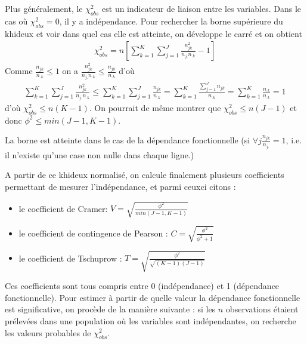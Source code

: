 \documentclass[letterpaper,10pt,english]{jupyterBook}
\begin{document}
\sphinxAtStartPar
Plus généralement, le \(\chi^2_{obs}\) est un indicateur de liaison entre les variables.  Dans le cas où \(\chi^2_{obs}=0\), il y a indépendance. Pour rechercher la borne supérieure du khi\sphinxhyphen{}deux et voir dans quel cas elle est atteinte, on développe le carré et on obtient
\begin{equation*}
\begin{split}\chi^2_{obs} = n\left [\displaystyle\sum_{k=1}^K\displaystyle\sum_{j=1}^J \frac{n_{jk}^2}{n_{j.}n_{.k}} -1\right ]\end{split}
\end{equation*}
\sphinxAtStartPar
Comme \(\frac{n_{jk}}{n_{.k}}\leq 1\) on a \( \frac{n_{jk}^2}{n_{j.}n_{.k}} \leq \frac{n_{jk}}{n_{.k}}\) d’où
\begin{equation*}
\begin{split}\displaystyle\sum_{k=1}^K\displaystyle\sum_{j=1}^J\frac{n_{jk}^2}{n_{j.}n_{.k}}\leq \displaystyle\sum_{k=1}^K\displaystyle\sum_{j=1}^J \frac{n_{jk}}{n_{.k}} = \displaystyle\sum_{k=1}^K \frac{\displaystyle\sum_{j=1}^J n_{jk}}{n_{.k}}=\displaystyle\sum_{k=1}^K \frac{n_{.k}}{n_{.k}}=1\end{split}
\end{equation*}
\sphinxAtStartPar
d’où \(\chi^2_{obs}\leq n(K-1)\). On pourrait de même montrer que \(\chi^2_{obs}\leq n(J-1)\) et donc \(\phi^2\leq min(J-1,K-1)\).

\sphinxAtStartPar
La borne est atteinte dans le cas de la dépendance fonctionnelle (si \(\forall j \frac{n_{jk}}{n_{j.}}=1\), i.e. il n’existe qu’une case non nulle dans chaque ligne.)

\sphinxAtStartPar
A partir de ce khi\sphinxhyphen{}deux normalisé, on calcule finalement plusieurs coefficients permettant de mesurer l’indépendance, et parmi ceux\sphinxhyphen{}ci citons :
\begin{itemize}
\item {} 
\sphinxAtStartPar
le coefficient de Cramer:
\(V=\sqrt{\frac{\phi^2}{min(J-1,K-1)}}\)

\item {} 
\sphinxAtStartPar
le coefficient de contingence de Pearson :
\(C = \sqrt{\frac{\phi^2}{\phi^2 + 1}}\)

\item {} 
\sphinxAtStartPar
le coefficient de Tschuprow :
\(T = \sqrt{\frac{\phi^2}{\sqrt{(K-1)(J-1)}}}\)

\end{itemize}

\sphinxAtStartPar
Ces coefficients sont tous compris entre 0 (indépendance) et 1 (dépendance fonctionnelle). Pour estimer à partir de quelle valeur la dépendance fonctionnelle est significative, on procède de la manière suivante : si les \(n\) observations étaient prélevées dans une population où les variables sont indépendantes, on recherche les valeurs probables de \(\chi^2_{obs}\).
\end{document}
